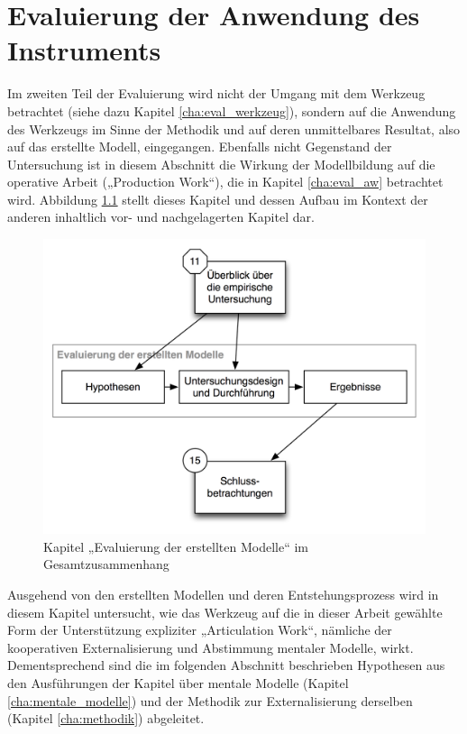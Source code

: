 

\chapter{Evaluierung der Anwendung des Instruments} %
\label{cha:eval_modell}

Im zweiten Teil der Evaluierung wird nicht der Umgang mit dem Werkzeug betrachtet (siehe dazu Kapitel \ref{cha:eval_werkzeug}), sondern auf die Anwendung des Werkzeugs im Sinne der Methodik und auf deren unmittelbares Resultat, also auf das erstellte Modell, eingegangen. Ebenfalls nicht Gegenstand der Untersuchung ist in diesem Abschnitt die Wirkung der Modellbildung auf die operative Arbeit („Production Work“), die in Kapitel \ref{cha:eval_aw} betrachtet wird. Abbildung \ref{fig:img_Kontextgrafiken_k13} stellt dieses Kapitel und dessen Aufbau im Kontext der anderen inhaltlich vor- und nachgelagerten Kapitel dar.


\begin{figure}[htbp]
	\centering
		\includegraphics[scale=0.6]{img/Kontextgrafiken/k13.png}
	\caption{Kapitel „Evaluierung der erstellten Modelle“ im Gesamtzusammenhang}
	\label{fig:img_Kontextgrafiken_k13}
\end{figure}


Ausgehend von den erstellten Modellen und deren Entstehungsprozess wird in diesem Kapitel untersucht, wie das Werkzeug auf die in dieser Arbeit gewählte Form der Unterstützung expliziter „Articulation Work“, nämliche der kooperativen Externalisierung und Abstimmung mentaler Modelle, wirkt. Dementsprechend sind die im folgenden Abschnitt beschrieben Hypothesen aus den Ausführungen der Kapitel über mentale Modelle (Kapitel \ref{cha:mentale_modelle}) und der Methodik zur Externalisierung derselben (Kapitel \ref{cha:methodik}) abgeleitet. 

